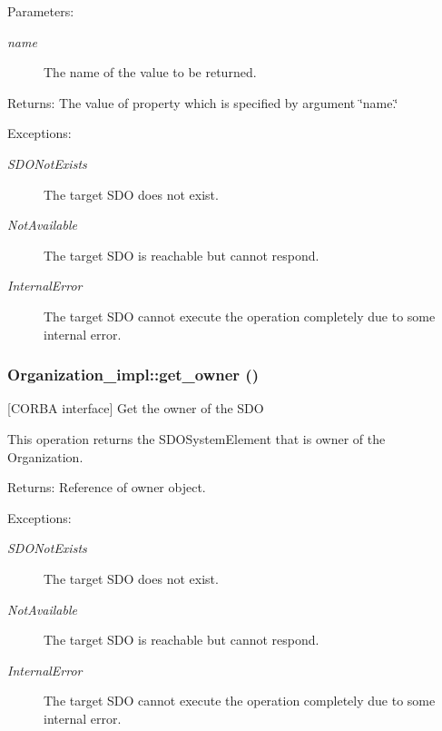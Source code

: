 \begin{Desc}
\item[Parameters:]
\begin{description}
\item[{\em name}]The name of the value to be returned. \end{description}
\end{Desc}
\begin{Desc}
\item[Returns:]The value of property which is specified by argument \char`\"{}name.\char`\"{} \end{Desc}
\begin{Desc}
\item[Exceptions:]
\begin{description}
\item[{\em SDONot\-Exists}]The target SDO does not exist. \item[{\em Not\-Available}]The target SDO is reachable but cannot respond. \item[{\em Internal\-Error}]The target SDO cannot execute the operation completely due to some internal error.\end{description}
\end{Desc}
\subsubsection{\setlength{\rightskip}{0pt plus 5cm}Organization\_\-impl::get\_\-owner ()}\label{classOrganization__impl_Organization__impla6}


[CORBA interface] Get the owner of the SDO 

This operation returns the SDOSystem\-Element that is owner of the Organization.

\begin{Desc}
\item[Returns:]Reference of owner object. \end{Desc}
\begin{Desc}
\item[Exceptions:]
\begin{description}
\item[{\em SDONot\-Exists}]The target SDO does not exist. \item[{\em Not\-Available}]The target SDO is reachable but cannot respond. \item[{\em Internal\-Error}]The target SDO cannot execute the operation completely due to some internal error.\end{description}
\end{Desc}
